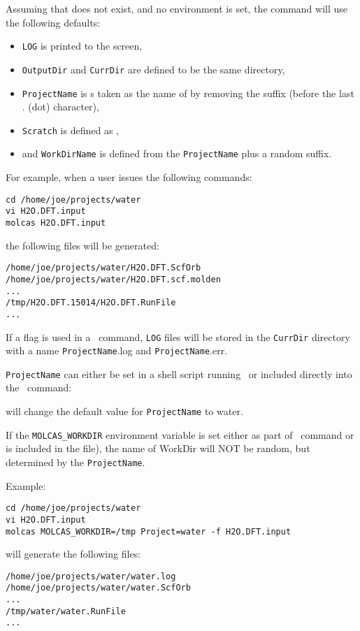 Assuming that  does not exist, and no environment is set, the command 
will use the following defaults:
\begin{itemize}
\item {\tt LOG} is printed to the screen,
\item {\tt OutputDir} and {\tt CurrDir} are defined to be the same directory,
\item {\tt ProjectName} is s taken as the name of  by removing the suffix (before the last . (dot) character),
\item {\tt Scratch} is defined as ,
\item and {\tt WorkDirName} is defined from the {\tt ProjectName} plus a random suffix.
\end{itemize}

For example, when a user issues the following commands:
\begin{verbatim}
cd /home/joe/projects/water
vi H2O.DFT.input
molcas H2O.DFT.input
\end{verbatim}
the following files will be generated:
\begin{verbatim}
/home/joe/projects/water/H2O.DFT.ScfOrb
/home/joe/projects/water/H2O.DFT.scf.molden
...
/tmp/H2O.DFT.15014/H2O.DFT.RunFile
...
\end{verbatim}

If a flag  is used in a \molcas\ command, {\tt LOG} files will be stored in the {\tt CurrDir} directory with a name
{\tt ProjectName}.log and {\tt ProjectName}.err.

{\tt ProjectName} can either be set in a shell script running \molcas\ or included directly into the \molcas\ command:
\begin{center}
\end{center}
will change the default value for {\tt ProjectName} to water.

If the {\tt MOLCAS\_WORKDIR} environment variable is set either as part of \molcas\ command or is included in the  file),
the name of WorkDir will NOT be random, but determined by the {\tt ProjectName}.

Example:
\begin{verbatim}
cd /home/joe/projects/water
vi H2O.DFT.input
molcas MOLCAS_WORKDIR=/tmp Project=water -f H2O.DFT.input
\end{verbatim}
will generate the following files:
\begin{verbatim}
/home/joe/projects/water/water.log
/home/joe/projects/water/water.ScfOrb
...
/tmp/water/water.RunFile
...
\end{verbatim}

